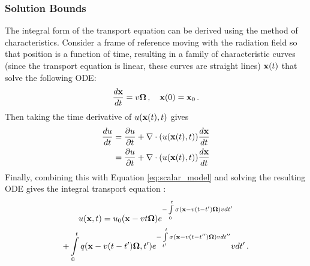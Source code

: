 
\subsubsection{Solution Bounds}\label{sec:solution_bounds}

The integral form of the transport equation can be derived using the method
of characteristics. Consider a frame of reference moving with the radiation field so that position is a function of time, resulting in a family of characteristic curves
(since the transport equation is linear, these curves are straight lines)
$\mathbf{x}(t)$ that solve the following ODE:
\begin{equation}
  \frac{d\mathbf{x}}{dt}=v\mathbf{\Omega}\,, \quad \mathbf{x}(0)=\mathbf{x}_0\,.
\end{equation}
Then taking the time derivative of $u(\mathbf{x}(t),t)$ gives
\begin{align}
  \frac{du}{dt} & = \frac{\partial u}{\partial t} + \nabla\cdot(u(\mathbf{x}(t),t))\frac{d\mathbf{x}}{dt}\\
    & =  \frac{\partial u}{\partial t} + \nabla\cdot(u(\mathbf{x}(t),t))\frac{d\mathbf{x}}{dt}
\end{align}
Finally, combining this with Equation \eqref{eq:scalar_model} and solving
the resulting ODE gives the integral transport equation \cite{glasstone}:
\begin{multline}\label{eq:integral_transport}
   u(\mathbf{x},t) = u_0(\mathbf{x} - v t\mathbf{\Omega}) e^{-\int\limits_0^t
    \sigma(\mathbf{x} - v(t -t')\mathbf{\Omega})v dt'}\\
    + \int\limits_0^t q(\mathbf{x} - v(t -t')\mathbf{\Omega},t') e^{-\int\limits_{t'}^t
    \sigma(\mathbf{x} - v(t -{t''})\mathbf{\Omega})v d{t''}} v dt' \,.
\end{multline}

